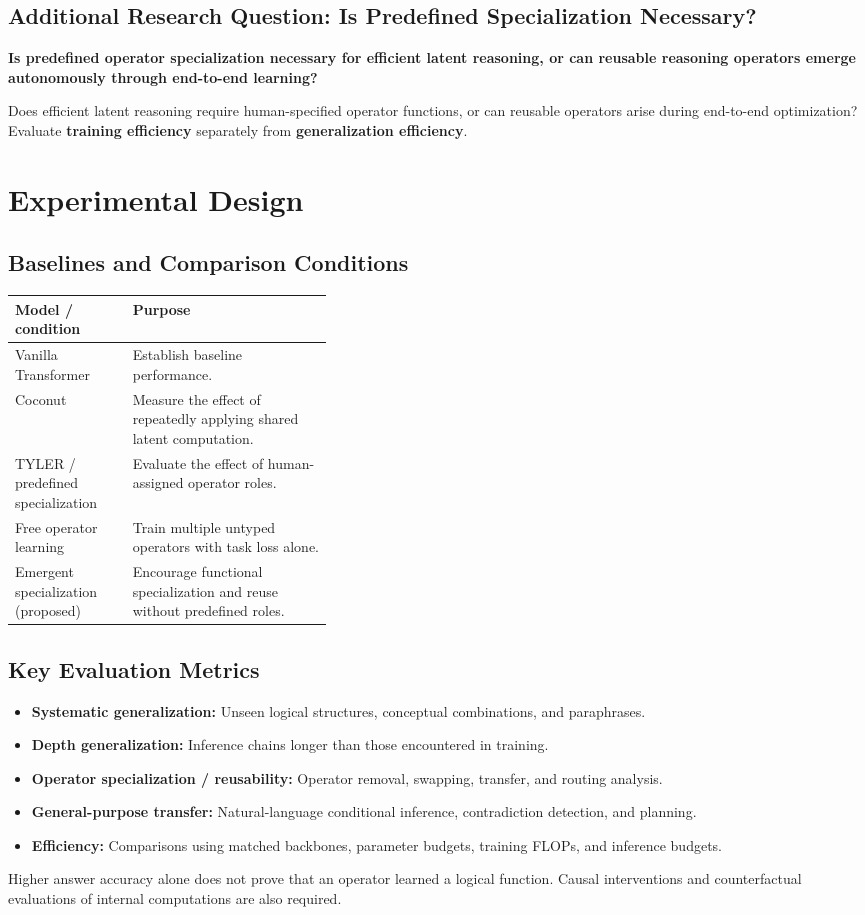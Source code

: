 \documentclass[11pt,a4paper]{article}
\newcommand{\tblhead}[1]{\textbf{#1}}
\begin{document}
\subsection*{Additional Research Question: Is Predefined Specialization Necessary?}
\textbf{Is predefined operator specialization necessary for efficient latent reasoning, or can reusable reasoning operators emerge autonomously through end-to-end learning?}

Does efficient latent reasoning require human-specified operator functions, or can reusable operators arise during end-to-end optimization? Evaluate \textbf{training efficiency} separately from \textbf{generalization efficiency}.

\section{Experimental Design}
\subsection{Baselines and Comparison Conditions}
\begin{tabularx}{\linewidth}{@{}p{0.37\linewidth}X@{}}
\toprule
\tblhead{Model / condition} & \tblhead{Purpose}\\
\midrule
Vanilla Transformer & Establish baseline performance.\\
Coconut & Measure the effect of repeatedly applying shared latent computation.\\
TYLER / predefined specialization & Evaluate the effect of human-assigned operator roles.\\
Free operator learning & Train multiple untyped operators with task loss alone.\\
Emergent specialization (proposed) & Encourage functional specialization and reuse without predefined roles.\\
\bottomrule
\end{tabularx}
\subsection{Key Evaluation Metrics}
\begin{itemize}
\item \textbf{Systematic generalization:} Unseen logical structures, conceptual combinations, and paraphrases.
\item \textbf{Depth generalization:} Inference chains longer than those encountered in training.
\item \textbf{Operator specialization / reusability:} Operator removal, swapping, transfer, and routing analysis.
\item \textbf{General-purpose transfer:} Natural-language conditional inference, contradiction detection, and planning.
\item \textbf{Efficiency:} Comparisons using matched backbones, parameter budgets, training FLOPs, and inference budgets.
\end{itemize}
Higher answer accuracy alone does not prove that an operator learned a logical function. Causal interventions and counterfactual evaluations of internal computations are also required.
\end{document}
